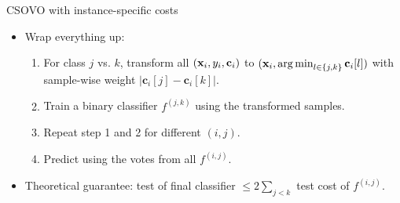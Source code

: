 \documentclass[11pt,compress,t,notes=noshow, xcolor=table]{beamer}
\newcommand{\cv}{\mathbf{c}}    %
\begin{document}
\begin{vbframe}{CSOVO with instance-specific costs}
    \footnotesize
    \begin{itemize}

    \item Wrap everything up:
    \begin{enumerate}
        \footnotesize
        \item For class $j$ vs. $k$, transform all $(\xv_i, y_i, \cv_i)$ to $(\xv_i, \argmin_{l \in \{j, k\}} \cv_i[l])$ with sample-wise weight $|\cv_i[j] - \cv_i[k]|$.
        \vspace{5pt}
        
        \item Train a binary classifier $f^{(j, k)}$ using the transformed samples.
        \vspace{5pt}
        
        \item Repeat step 1 and 2 for different $(i, j)$.
        \vspace{5pt}
        
        \item Predict using the votes from all $f^{(i, j)}$.
    \end{enumerate}
    \vspace{5pt}

    \item Theoretical guarantee: test of final classifier $\leq 2\sum_{j < k}$ test cost of $f^{(i, j)}$. 
    \end{itemize}
\end{vbframe}
\end{document}
